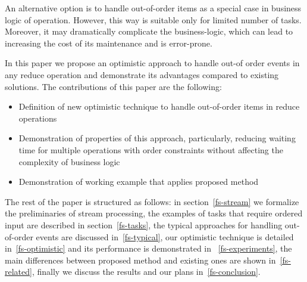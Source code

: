 An alternative option is to handle out-of-order items as a special case in business logic of operation. However, this way is suitable only for limited number of tasks. Moreover, it may dramatically complicate the business-logic, which can lead to increasing the cost of its maintenance and is error-prone.

In this paper we propose an optimistic approach to handle out-of order events in any reduce operation and demonstrate its advantages compared to existing solutions. The contributions of this paper are the following: 
\begin {itemize}
\item Definition of new optimistic technique to handle out-of-order items in reduce operations
\item Demonstration of properties of this approach, particularly, reducing waiting time for multiple operations with order constraints without affecting the complexity of business logic
\item Demonstration of working example that applies proposed method
\end {itemize}

The rest of the paper is structured as follows: in section~\ref{fs-stream} we formalize the preliminaries of stream processing, the examples of tasks that require ordered input are described in section~\ref{fs-tasks}, the typical approaches for handling out-of-order events are discussed in~\ref{fs-typical}, our optimistic technique is detailed in~\ref{fs-optimistic} and its performance is demonstrated in ~\ref{fs-experiments}, the main differences between proposed method and existing ones are shown in~\ref{fs-related}, finally we discuss the results and our plans in~\ref{fs-conclusion}.